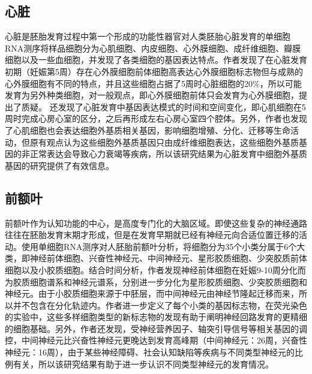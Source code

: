 \documentclass[lang=cn]{elegantpaper}
\begin{document}
\subsection{心脏}
心脏是胚胎发育过程中第一个形成的功能性器官\citep{buckingham_building_2005}对人类胚胎心脏发育的单细胞RNA测序将样品细胞分为心肌细胞、内皮细胞、心外膜细胞、成纤维细胞、瓣膜细胞以及一些血细胞，并发现了各类细胞的基因表达特点\citep{cui_single-cell_2019}。作者发现了在心脏发育初期（妊娠第5周）存在心外膜细胞前体细胞高表达心外膜细胞标志物但与成熟的心外膜细胞有不同的特点，并且这些细胞占据了5周时心脏细胞的20\%，所以可能发育为另外种类细胞，对一般观点，即心外膜细胞前体只会发育为心外膜细胞\citep{wessels_epicardium_2004}，提出了质疑。
\cite{cui_single-cell_2019}还发现了心脏发育中基因表达模式的时间和空间变化，即心肌细胞在5周时完成心房心室的区分，之后再形成左右心房心室四个腔体。另外，作者也发现了心肌细胞也会表达细胞外基质相关基因，影响细胞增殖、分化、迁移等生命活动\citep{doppler_cardiac_2017}，但原有观点认为这些细胞外基质基因只由成纤维细胞表达\citep{lockhart_extracellular_2011}，这些细胞外基质基因的非正常表达会导致心力衰竭等疾病\citep{bassat_extracellular_2017}，所以该研究结果为心脏发育中细胞外基质基因的研究提供了有效信息。

\subsection{前额叶}
前额叶作为认知功能的中心，是高度专门化的大脑区域\citep{roth_evolution_2012}。即使这些复杂的神经通路往往在胚胎发育末期才形成，但是在发育早期就已经有神经元向合适位置迁移的活动\citep{orahilly_significant_2008}。\cite{zhong_single-cell_2018}使用单细胞RNA测序对人胚胎前额叶分析，将细胞分为35个小类分属于6个大类，即神经前体细胞、兴奋性神经元、中间神经元、星形胶质细胞、少突胶质前体细胞以及小胶质细胞。结合时间分析，作者发现神经前体细胞在妊娠9-10周分化而为胶质细胞谱系和神经元谱系，分别进一步分化为星形胶质细胞、少突胶质细胞和神经元。由于小胶质细胞来源于中胚层\citep{trapnell_dynamics_2014}，而中间神经元由神经节隆起迁移而来\citep{ma_subcortical_2013}，所以并不包含在分化轨迹内。作者进一步定义了每个小类的基因标志物，在荧光染色的实验中，这些多样细胞类型的新标志物的发现有助于阐明神经回路发育的更精细的细胞基础。另外，作者还发现，受神经营养因子、轴突引导信号等相关基因的调控，中间神经元比兴奋性神经元更晚达到发育高峰期（中间神经元：26周，兴奋性神经元：16周），由于某些神经障碍、社会认知缺陷等疾病与不同类型神经元的比例有关\citep{shi_rin_2005}，所以该研究结果有助于进一步认识不同类型神经元的发育情况。
\end{document}
